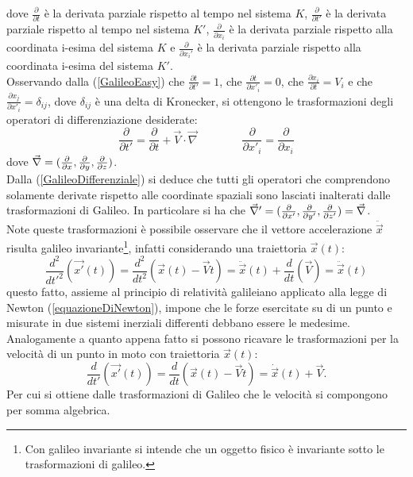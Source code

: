 dove $\frac{\partial}{\partial t}$ è la derivata parziale rispetto al tempo nel sistema $K$, $\frac{\partial}{\partial t'}$ è la derivata parziale rispetto al tempo nel sistema $K'$, $\frac{\partial}{\partial x_i}$ è la derivata parziale rispetto alla coordinata i-esima del sistema $K$ e $\frac{\partial}{\partial x_i'}$ è la derivata parziale rispetto alla coordinata i-esima del sistema $K'$.\\Osservando dalla (\ref{GalileoEasy}) che $\frac{\partial t}{\partial t'}=1$, che 
$\frac{\partial t}{\partial x'_i}=0$, che $\frac{\partial x_i}{\partial t}=V_i$ e che 
$\frac{\partial x_j}{\partial x'_i}=\delta_{ij}$, dove $\delta_{ij}$ è una delta di Kronecker, 
si ottengono le trasformazioni degli operatori di differenziazione desiderate:
\begin{equation}
	\frac{\partial}{\partial t'}=\frac{\partial}{\partial t}+\vec{V}\cdot\vec{\nabla} \qquad \qquad
	\frac{\partial}{\partial x'_i}=\frac{\partial}{\partial x_i}
	\label{GalileoDifferenziale}
\end{equation}
dove $\vec{\nabla}=(\frac{\partial }{\partial x},\frac{\partial }{\partial y},\frac{\partial }{\partial z})$.\\
Dalla (\ref{GalileoDifferenziale}) si deduce che tutti gli operatori che comprendono solamente derivate 
rispetto alle coordinate spaziali sono lasciati inalterati dalle trasformazioni di Galileo. In particolare si ha che $\vec{\nabla}'=(\frac{\partial }{\partial x'},\frac{\partial }{\partial y'},\frac{\partial }{\partial z'})=\vec{\nabla}$.\\

Note queste trasformazioni è possibile osservare che il vettore accelerazione $\ddot{\vec{x}}$ risulta galileo invariante\footnote{Con galileo invariante si intende che un oggetto fisico è invariante sotto le trasformazioni di galileo.}, infatti considerando una traiettoria $\vec{x}(t)$:
\begin{equation*}
	\frac{d^2}{dt'^2}(\vec{x'}(t))=\frac{d^2}{dt^2}(\vec{x}(t)-\vec{V}t)=\ddot{\vec{x}}(t)+\frac{d}{dt}(\vec{V})=\ddot{\vec{x}}(t)
\end{equation*} 
questo fatto, assieme al principio di relatività galileiano applicato alla legge di Newton (\ref{equazioneDiNewton}), 
impone che le forze esercitate su di un punto e misurate in due sistemi inerziali differenti debbano essere le medesime. \\

Analogamente a quanto appena fatto si possono ricavare le trasformazioni per la velocità di un punto in moto con traiettoria $\vec{x}(t)$:
\begin{equation}
	\frac{d}{dt'}(\vec{x'}(t))=\frac{d}{dt}(\vec{x}(t)-\vec{V}t)=\dot{\vec{x}}(t)+\vec{V}.
\end{equation}
Per cui si ottiene dalle trasformazioni di Galileo che le velocità si compongono per somma algebrica.\\

